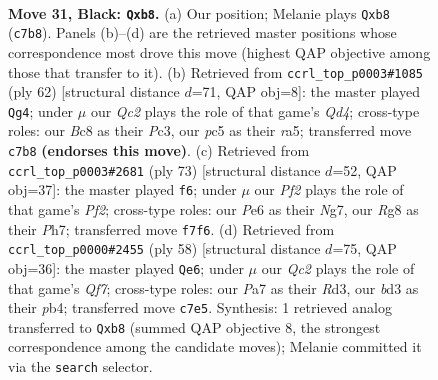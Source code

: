 \documentclass[11pt]{article}
\begin{document}
\clearpage

\begin{figure}[p]\centering
\begin{subfigure}{0.46\textwidth}\centering
\resizebox{\linewidth}{!}{%
\newchessgame
\chessboard[
  setfen={1Rb2kr1/p1q2p2/2p1p2p/2P3p1/8/3B4/P7/3KR3 b - - 0 31},
  showmover=false,
  pgfstyle=straightmove, color=movearrow, markmove={c7-b8}
]}
\caption{}
\end{subfigure}\hfill
\begin{subfigure}{0.46\textwidth}\centering
\resizebox{\linewidth}{!}{%
\newchessgame
\chessboard[
  setfen={5k2/4b3/2r4p/r7/P2Q3P/1PP3P1/2K5/8 w - - 1 32},
  showmover=false,
  pgfstyle=straightmove, color=movearrow, markmove={d4-g4}
]}
\caption{}
\end{subfigure}
\\[4pt]
\begin{subfigure}{0.46\textwidth}\centering
\resizebox{\linewidth}{!}{%
\newchessgame
\chessboard[
  setfen={Rb4k1/1pq2pnp/2p5/3pr3/8/3P1B1P/1Q3P2/6RK b - - 3 37},
  showmover=false,
  pgfstyle=straightmove, color=movearrow, markmove={f7-f6}
]}
\caption{}
\end{subfigure}\hfill
\begin{subfigure}{0.46\textwidth}\centering
\resizebox{\linewidth}{!}{%
\newchessgame
\chessboard[
  setfen={1k1r4/1b1B1Q2/p7/4q3/1p6/3R1P2/PPP5/2K5 w - - 1 30},
  showmover=false,
  pgfstyle=straightmove, color=movearrow, markmove={f7-e6}
]}
\caption{}
\end{subfigure}
\caption{\textbf{Move 31, Black: \texttt{Qxb8}.} (a) Our position; Melanie plays \texttt{Qxb8} (\texttt{c7b8}). Panels (b)--(d) are the retrieved master positions whose correspondence most drove this move (highest QAP objective among those that transfer to it). (b) Retrieved from \texttt{ccrl\_top\_p0003\#1085} (ply 62) [structural distance $d$=71, QAP obj=8]: the master played \texttt{Qg4}; under $\mu$ our \emph{Qc2} plays the role of that game's \emph{Qd4}; cross-type roles: our \emph{B}c8 as their \emph{P}c3, our \emph{p}c5 as their \emph{r}a5; transferred move \texttt{c7b8} \textbf{(endorses this move)}. (c) Retrieved from \texttt{ccrl\_top\_p0003\#2681} (ply 73) [structural distance $d$=52, QAP obj=37]: the master played \texttt{f6}; under $\mu$ our \emph{Pf2} plays the role of that game's \emph{Pf2}; cross-type roles: our \emph{P}e6 as their \emph{N}g7, our \emph{R}g8 as their \emph{P}h7; transferred move \texttt{f7f6}. (d) Retrieved from \texttt{ccrl\_top\_p0000\#2455} (ply 58) [structural distance $d$=75, QAP obj=36]: the master played \texttt{Qe6}; under $\mu$ our \emph{Qc2} plays the role of that game's \emph{Qf7}; cross-type roles: our \emph{P}a7 as their \emph{R}d3, our \emph{b}d3 as their \emph{p}b4; transferred move \texttt{c7e5}. Synthesis: 1 retrieved analog transferred to \texttt{Qxb8} (summed QAP objective 8, the strongest correspondence among the candidate moves); Melanie committed it via the \texttt{search} selector.}
\label{fig:thought-m61}
\end{figure}
\end{document}
